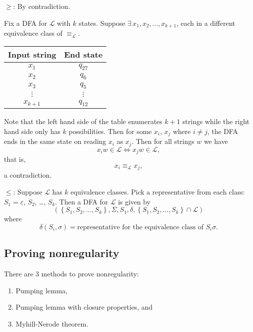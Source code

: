 \documentclass{notes}
\begin{document}
\begin{prf}
  $\geq$: By contradiction.

  Fix a DFA for $\mathcal L$ with $k$ states.
  Suppose $\exists \, x_1, x_2, \dots, x_{k + 1}$, each in a different equivalence class of $\equiv_\mathcal L$.
  
  \begin{center}
    \begin{tabular}{cc}
      Input string & End state \\ 
      \hline
      $x_1$ & $q_{27}$ \\ 
      $x_2$ & $q_6$ \\ 
      $x_3$ & $q_5$ \\ 
      $\vdots$ & $\vdots$ \\ 
      $x_{k + 1}$ & $q_{12}$
    \end{tabular}
  \end{center}
  
  Note that the left hand side of the table enumerates $k + 1$ strings while the right hand side only has $k$ possibilities.
  Then for some $x_i$, $x_j$ where $i \neq j$, the DFA ends in the same state on reading $x_i$ as $x_j$.
  Then for all strings $w$ we have 
  \[
    x_i w \in \mathcal L \Leftrightarrow x_j w \in \mathcal L, 
  \]
  that is, 
  \[
    x_i \equiv_\mathcal L x_j, 
  \]
  a contradiction.
  
  $\leq$: Suppose $\mathcal L$ has $k$ equivalence classes.
  Pick a representative from each class: $S_1 = \varepsilon$, $S_2$, \dots, $S_k$.
  Then a DFA for $\mathcal L$ is given by 
  \[
    (\left \{ S_1, S_2, \dots, S_k \right \}, \Sigma, S_1, \delta, \left \{ S_1, S_2, \dots, S_k \right \} \cap \mathcal L)
  \]
  where 
  \[
    \delta(S_i, \sigma) = \text{representative for the equivalence class of $S_i \sigma$}.
  \]
\end{prf}

\subsection{Proving nonregularity}

There are 3 methods to prove nonregularity: 

\begin{enumerate}
  \item Pumping lemma, 
  
  \item Pumping lemma with closure properties, and 

  \item Myhill-Nerode theorem.
\end{enumerate}
\end{document}
